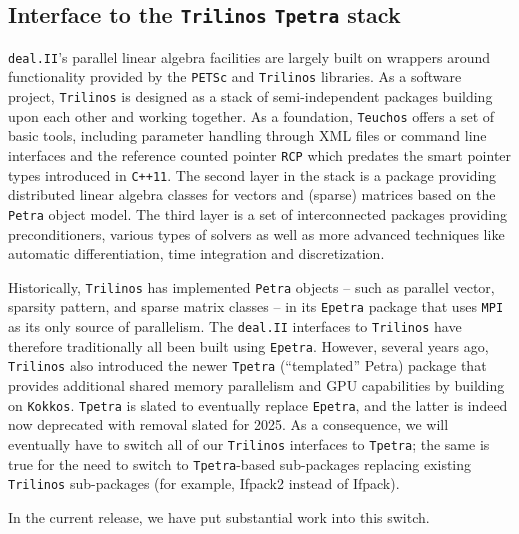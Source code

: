 \documentclass{ansarticle-preprint}
\newcommand{\specialword}[1]{\texttt{#1}}
\newcommand{\dealii}{{\specialword{deal.II}}\xspace}
\newcommand{\trilinos}{{\specialword{Trilinos}}\xspace}
\newcommand{\petsc}{\specialword{PETSc}\xspace}
\newcommand{\MPI}{{\specialword{MPI}}\xspace}
\newcommand{\kokkos}{{\specialword{Kokkos}}\xspace}
\newcommand{\epetra}{{\specialword{Epetra}}\xspace}
\newcommand{\petra}{{\specialword{Petra}}\xspace}
\newcommand{\teuchos}{{\specialword{Teuchos}}\xspace}
\newcommand{\tpetra}{{\specialword{Tpetra}}\xspace}
\begin{document}
\subsection{Interface to the \trilinos{} \tpetra stack}\label{sec:tpetra}

\dealii{}'s parallel linear algebra facilities are largely built on
wrappers around functionality provided by the \petsc{} and \trilinos{} libraries.
As a software project, \trilinos{} is designed as a stack of semi-independent
packages building upon each other and working together. 
As a foundation, \teuchos{} offers a set of basic tools,
including parameter handling through XML files or command line interfaces 
and the reference counted pointer \texttt{RCP} which predates 
the smart pointer types introduced in \texttt{C++11}.
The second layer in the stack is a package providing distributed linear algebra 
classes for vectors and (sparse) matrices based on the \petra{}
object model. The third layer is a set of interconnected packages
providing preconditioners, various types of solvers 
as well as more advanced techniques like automatic differentiation, 
time integration and discretization.

Historically, \trilinos{} has implemented \petra{} objects -- such as
parallel vector, sparsity pattern, and sparse matrix classes -- in its
\epetra{} package that uses \MPI{} as its only source of
parallelism. The \dealii{} interfaces to \trilinos{} have therefore traditionally all
been built using \epetra{}.
However, several years ago, \trilinos also introduced the
newer \tpetra{} (``templated'' Petra) package that provides additional shared memory 
parallelism and GPU capabilities by building on \kokkos{}. \tpetra{}
is slated to eventually replace \epetra{}, and the latter is indeed
now deprecated with removal slated for 2025. As a consequence, we will
eventually have to switch all of our \trilinos{} interfaces to
\tpetra{}; the same is true for the need to switch to \tpetra{}-based
sub-packages replacing existing \trilinos sub-packages (for example,
Ifpack2 instead of Ifpack).

In the current release, we have put substantial work into this switch.

\end{document}
